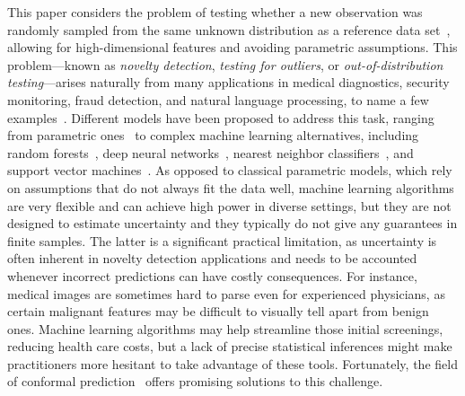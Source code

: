 \documentclass[11pt]{article}
\begin{document}
This paper considers the problem of testing whether a new observation was randomly sampled from the same unknown distribution as a reference data set~\cite{grubbs1969procedures}, allowing for high-dimensional features and avoiding parametric assumptions.
This problem---known as {\it novelty detection}, {\it testing for outliers}, or {\em out-of-distribution testing}---arises naturally from many applications in medical diagnostics, security monitoring, fraud detection, and natural language processing, to name a few examples~\cite{pimentel2014review}. 
Different models have been proposed to address this task, ranging from parametric ones~\cite{markou2003novelty} to complex machine learning alternatives, including random forests~\cite{desir2013one}, deep neural networks~\cite{markou2003novelty}, nearest neighbor classifiers~\cite{hautamaki2004outlier}, and support vector machines~\cite{clifton2014probabilistic}.
As opposed to classical parametric models, which rely on assumptions that do not always fit the data well, machine learning algorithms are very flexible and can achieve high power in diverse settings, but they are not designed to estimate uncertainty and they typically do not give any guarantees in finite samples.
The latter is a significant practical limitation, as uncertainty is often inherent in novelty detection applications and needs to be accounted whenever incorrect predictions can have costly consequences.
For instance, medical images are sometimes hard to parse even for experienced physicians, as certain malignant features may be difficult to visually tell apart from benign ones. Machine learning algorithms may help streamline those initial screenings, reducing health care costs, but a lack of precise statistical inferences might make practitioners more hesitant to take advantage of these tools.
Fortunately, the field of conformal prediction~\cite{vovk1999machine,vovk2005algorithmic} offers promising solutions to this challenge.


\end{document}
